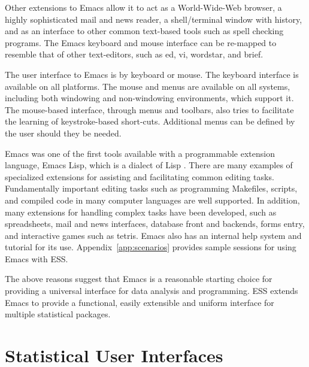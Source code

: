 \documentclass{article}
\begin{document}
Other extensions to Emacs allow it to act as a World-Wide-Web browser,
a highly sophisticated mail and news reader, a shell/terminal window
with history, and as an interface to other common text-based tools
such as spell checking programs.  The Emacs keyboard and mouse
interface can be re-mapped to resemble that of other text-editors,
such as ed, vi, wordstar, and brief.

The user interface to Emacs is by keyboard or mouse.  The keyboard interface
is available on all platforms.  The mouse and menus are available on all
systems, including both windowing and non-windowing environments,
which support it.  The mouse-based interface, through menus and
toolbars, also tries to facilitate the learning of keystroke-based
short-cuts.  Additional menus can be defined by the user should they
be needed.

Emacs was one of the first tools available with a programmable
extension language, Emacs Lisp, which is a dialect of Lisp
\citep{RChassell1999,PGraham:1996}.  There are many examples of
specialized extensions for assisting and facilitating common editing
tasks.  Fundamentally important editing tasks such as programming
Makefiles, scripts, and compiled code in many computer languages are
well supported.  In addition, many extensions for handling complex
tasks have been developed, such as spreadsheets, mail and news
interfaces, database front and backends, forms entry, and interactive
games such as tetris.  Emacs also has an internal help system and
tutorial for its use.  Appendix~\ref{app:scenarios} provides sample
sessions for using Emacs with ESS.

The above reasons suggest that Emacs is a reasonable starting choice
for providing a universal interface for data analysis and programming.
ESS extends Emacs to provide a functional, easily extensible and uniform
interface for multiple statistical packages.  


\section{Statistical User Interfaces}
\label{sec:UI}
\end{document}
